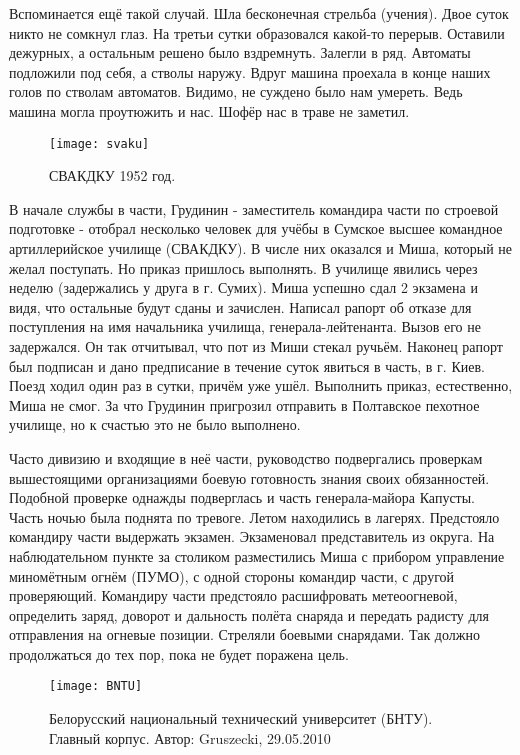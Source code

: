 Вспоминается ещё такой случай. Шла бесконечная стрельба (учения). Двое суток никто не сомкнул глаз. На третьи сутки образовался какой-то перерыв. Оставили дежурных, а остальным решено было вздремнуть. Залегли в ряд. Автоматы подложили под себя, а стволы наружу. Вдруг машина проехала в конце наших голов по стволам автоматов. Видимо, не суждено было нам умереть. Ведь машина могла проутюжить и нас. Шофёр нас в траве не заметил.

\begin{wrapfigure}{O}{.4\textwidth}
\centering
\texttt{[image: svaku]}
\caption[СВАКДКУ 1952 год.]{СВАКДКУ 1952 год\footnotemark.}
\label{fig:svaku}
\end{wrapfigure}

В начале службы в части, Грудинин - заместитель командира части по строевой подготовке - отобрал несколько человек для учёбы в Сумское высшее командное артиллерийское училище (СВАКДКУ). В числе них оказался и Миша, который не желал поступать. Но приказ пришлось выполнять. В училище явились через неделю (задержались у друга в г. Сумих). Миша успешно сдал 2 экзамена и видя, что остальные будут сданы и зачислен. Написал рапорт об отказе для поступления на имя начальника училища, генерала-лейтенанта. Вызов его не задержался. Он так отчитывал, что пот из Миши стекал ручьём. Наконец рапорт был подписан и дано предписание в течение суток явиться в часть, в г. Киев. Поезд ходил один раз в сутки, причём уже ушёл. Выполнить приказ, естественно, Миша не смог. За что Грудинин пригрозил отправить в Полтавское пехотное училище, но к счастью это не было выполнено. 

Часто дивизию и входящие в неё части, руководство подвергались проверкам вышестоящими организациями боевую готовность знания своих обязанностей. Подобной проверке однажды подверглась и часть генерала-майора Капусты. Часть ночью была поднята по тревоге. Летом находились в лагерях. Предстояло командиру части выдержать экзамен. Экзаменовал представитель из округа. На наблюдательном пункте за столиком разместились Миша с прибором управление миномётным огнём (ПУМО), с одной стороны командир части, с другой проверяющий. Командиру части предстояло расшифровать метеоогневой, определить заряд, доворот и дальность полёта снаряда и передать радисту для отправления на огневые позиции. Стреляли боевыми снарядами. Так должно продолжаться до тех пор, пока не будет поражена цель. 

\begin{wrapfigure}{O}{.4\textwidth}
\centering
\texttt{[image: BNTU]}
\caption{Белорусский национальный технический университет (БНТУ). Главный корпус. Автор: Gruszecki, 29.05.2010}
\label{fig:BNTU}
\end{wrapfigure}


